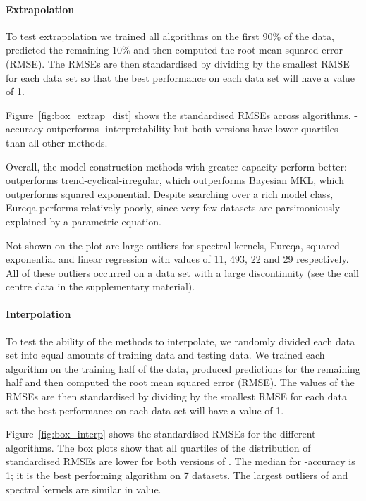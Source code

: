\paragraph{Extrapolation}

To test extrapolation we trained all algorithms on the first 90\% of the data, predicted the remaining 10\% and then computed the root mean squared error (RMSE).
The RMSEs are then standardised by dividing by the smallest RMSE for each data set so that the best performance on each data set will have a value of 1.

Figure~\ref{fig:box_extrap_dist} shows the standardised RMSEs across algorithms.
\procedurename{}-accuracy outperforms \procedurename{}-interpretability but both versions have lower quartiles than all other methods.

Overall, the model construction methods with greater capacity perform better: \procedurename{} outperforms trend-cyclical-irregular, which outperforms Bayesian MKL, which outperforms squared exponential.
Despite searching over a rich model class, Eureqa performs relatively poorly, since very few datasets are parsimoniously explained by a parametric equation.

Not shown on the plot are large outliers for spectral kernels, Eureqa, squared exponential and linear regression with values of 11, 493, 22 and 29 respectively.
All of these outliers occurred on a data set with a large discontinuity (see the call centre data in the supplementary material).

\paragraph{Interpolation}

To test the ability of the methods to interpolate, we randomly divided each data set into equal amounts of training data and testing data.
We trained each algorithm on the training half of the data, produced predictions for the remaining half and then computed the root mean squared error (RMSE).
The values of the RMSEs are then standardised by dividing by the smallest RMSE for each data set \ie the best performance on each data set will have a value of 1.

Figure~\ref{fig:box_interp} shows the standardised RMSEs for the different algorithms.
The box plots show that all quartiles of the distribution of standardised RMSEs are lower for both versions of \procedurename{}.
The median for \procedurename{}-accuracy is 1; it is the best performing algorithm on 7 datasets.
The largest outliers of \procedurename{} and spectral kernels are similar in value.

